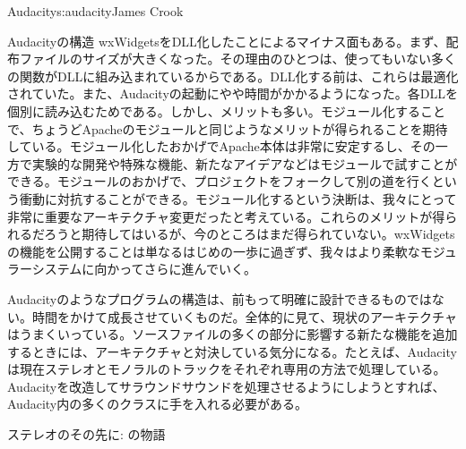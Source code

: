 \begin{aosachapter}{Audacity}{s:audacity}{James Crook}
\begin{aosasect1}{Audacityの構造}
wxWidgetsをDLL化したことによるマイナス面もある。まず、配布ファイルのサイズが大きくなった。その理由のひとつは、使ってもいない多くの関数がDLLに組み込まれているからである。DLL化する前は、これらは最適化されていた。また、Audacityの起動にやや時間がかかるようになった。各DLLを個別に読み込むためである。しかし、メリットも多い。モジュール化することで、ちょうどApacheのモジュールと同じようなメリットが得られることを期待している。モジュール化したおかげでApache本体は非常に安定するし、その一方で実験的な開発や特殊な機能、新たなアイデアなどはモジュールで試すことができる。モジュールのおかげで、プロジェクトをフォークして別の道を行くという衝動に対抗することができる。モジュール化するという決断は、我々にとって非常に重要なアーキテクチャ変更だったと考えている。これらのメリットが得られるだろうと期待してはいるが、今のところはまだ得られていない。wxWidgetsの機能を公開することは単なるはじめの一歩に過ぎず、我々はより柔軟なモジュラーシステムに向かってさらに進んでいく。

Audacityのようなプログラムの構造は、前もって明確に設計できるものではない。時間をかけて成長させていくものだ。全体的に見て、現状のアーキテクチャはうまくいっている。ソースファイルの多くの部分に影響する新たな機能を追加するときには、アーキテクチャと対決している気分になる。たとえば、Audacityは現在ステレオとモノラルのトラックをそれぞれ専用の方法で処理している。Audacityを改造してサラウンドサウンドを処理させるようにしようとすれば、Audacity内の多くのクラスに手を入れる必要がある。
\newpage %
\begin{aosabox}{ステレオのその先に: の物語}


\end{aosabox}
\end{aosasect1}
\end{aosachapter}

